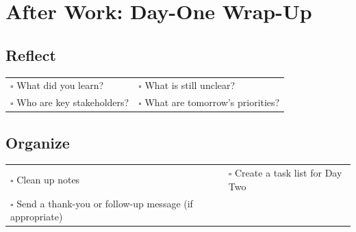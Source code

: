 
\section{After Work: Day-One Wrap-Up}
\label{sec:after}

\subsection{Reflect}

\begin{tabular}{p{9cm} p{8cm}}
$\square$ What did you learn? & $\square$ What is still unclear? \\ 
$\square$ Who are key stakeholders? & $\square$ What are tomorrow’s priorities? \\ 
\end{tabular}

\subsection{Organize}

\begin{tabular}{p{9cm} p{8cm}}
$\square$ Clean up notes & $\square$ Create a task list for Day Two \\ 
$\square$ Send a thank-you or follow-up message (if appropriate) & \\ 
\end{tabular}

